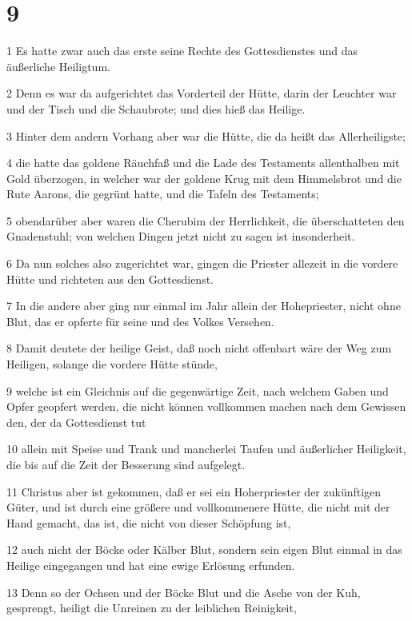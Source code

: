 \chapter{9}

\par 1 Es hatte zwar auch das erste seine Rechte des Gottesdienstes und das äußerliche Heiligtum.
\par 2 Denn es war da aufgerichtet das Vorderteil der Hütte, darin der Leuchter war und der Tisch und die Schaubrote; und dies hieß das Heilige.
\par 3 Hinter dem andern Vorhang aber war die Hütte, die da heißt das Allerheiligste;
\par 4 die hatte das goldene Räuchfaß und die Lade des Testaments allenthalben mit Gold überzogen, in welcher war der goldene Krug mit dem Himmelsbrot und die Rute Aarons, die gegrünt hatte, und die Tafeln des Testaments;
\par 5 obendarüber aber waren die Cherubim der Herrlichkeit, die überschatteten den Gnadenstuhl; von welchen Dingen jetzt nicht zu sagen ist insonderheit.
\par 6 Da nun solches also zugerichtet war, gingen die Priester allezeit in die vordere Hütte und richteten aus den Gottesdienst.
\par 7 In die andere aber ging nur einmal im Jahr allein der Hohepriester, nicht ohne Blut, das er opferte für seine und des Volkes Versehen.
\par 8 Damit deutete der heilige Geist, daß noch nicht offenbart wäre der Weg zum Heiligen, solange die vordere Hütte stünde,
\par 9 welche ist ein Gleichnis auf die gegenwärtige Zeit, nach welchem Gaben und Opfer geopfert werden, die nicht können vollkommen machen nach dem Gewissen den, der da Gottesdienst tut
\par 10 allein mit Speise und Trank und mancherlei Taufen und äußerlicher Heiligkeit, die bis auf die Zeit der Besserung sind aufgelegt.
\par 11 Christus aber ist gekommen, daß er sei ein Hoherpriester der zukünftigen Güter, und ist durch eine größere und vollkommenere Hütte, die nicht mit der Hand gemacht, das ist, die nicht von dieser Schöpfung ist,
\par 12 auch nicht der Böcke oder Kälber Blut, sondern sein eigen Blut einmal in das Heilige eingegangen und hat eine ewige Erlösung erfunden.
\par 13 Denn so der Ochsen und der Böcke Blut und die Asche von der Kuh, gesprengt, heiligt die Unreinen zu der leiblichen Reinigkeit,
